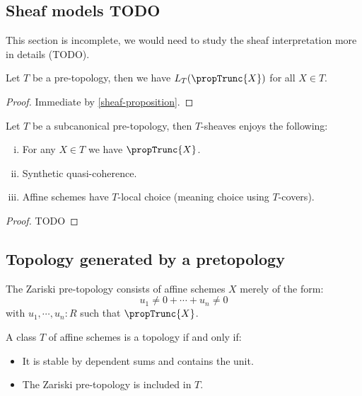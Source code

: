 \subsection{Sheaf models TODO}

This section is incomplete, we would need to study the sheaf interpretation more in details (TODO).

\begin{lemma}\label{cover-are-surjective}
Let $T$ be a pre-topology, then we have $L_T(\propTrunc{X})$ for all $X\in T$.
\end{lemma}

\begin{proof}
Immediate by \cref{sheaf-proposition}.
\end{proof}

\begin{theorem}\label{sheaves-internal}
Let $T$ be a subcanonical pre-topology, then $T$-sheaves enjoys the following:
\begin{enumerate}[(i)]
\item For any $X\in T$ we have $\propTrunc{X}$.
\item Synthetic quasi-coherence.
\item Affine schemes have $T$-local choice (meaning choice using $T$-covers).
\end{enumerate}
\end{theorem}

\begin{proof}
TODO
\end{proof}


\subsection{Topology generated by a pretopology}

\begin{definition}
The Zariski pre-topology consists of affine schemes $X$ merely of the form:
\[u_1\not=0+\cdots+u_n\not=0\] 
with $u_1,\cdots,u_n:R$ such that $\propTrunc{X}$.
\end{definition}

\begin{lemma}
A class $T$ of affine schemes is a topology if and only if:
\begin{itemize}
\item It is stable by dependent sums and contains the unit.
\item The Zariski pre-topology is included in $T$.
\end{itemize}
\end{lemma}

